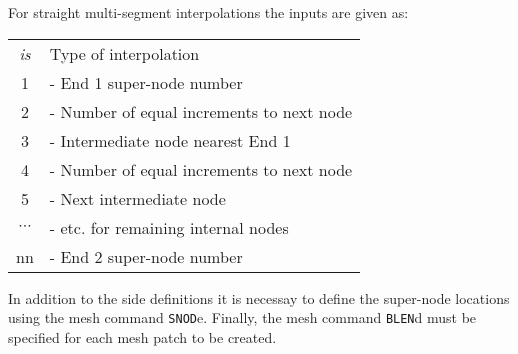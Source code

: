 For straight multi-segment interpolations the inputs are given as:

\begin{center}
\begin{tabular}{c l}
\it  is     & \qquad Type of interpolation \\
      1     &  - End 1 super-node number \\
      2     &  - Number of equal increments to next node \\
      3     &  - Intermediate node nearest End 1 \\
      4     &  - Number of equal increments to next node \\
      5     &  - Next intermediate node \\
  $\cdots$  &  - etc. for remaining internal nodes \\
     nn     &  - End 2 super-node number
\end{tabular}
\end{center}
In addition to the side definitions it is necessay to define the super-node
locations using the mesh command {\tt SNOD}e.  Finally, the mesh command
{\tt BLEN}d must be specified for each mesh patch to be created.
\vfil\eject
